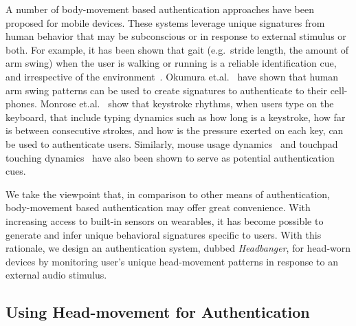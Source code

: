 

A number of body-movement based authentication approaches have been proposed for mobile devices. These systems
leverage unique signatures from human behavior that may be subconscious
or in response to external stimulus or both.  For example, it has been shown that gait (e.g.~stride length, the amount of arm swing) when the user is walking or
running is a reliable identification cue, and irrespective of the
environment~\cite{stevenage1999visual}. Okumura et.al.~\cite{okumura2006study}
have shown that human arm swing patterns can be used to create signatures
to authenticate to their cell-phones. Monrose
et.al.~\cite{monrose2000keystroke} show that keystroke rhythms, when
users type on the keyboard, that include typing dynamics such as how
long is a keystroke, how far is between consecutive strokes, and how is the
pressure exerted on each key, can be used to authenticate
users. Similarly, mouse usage dynamics~\cite{jorgensen2011mouse} and touchpad
touching dynamics~\cite{bo2013silentsense,de2012touch} have also been shown to
serve as potential authentication cues.

We take the viewpoint that, in comparison to other means of authentication, body-movement based
authentication may offer great convenience. With increasing access to built-in sensors on wearables, it
has become possible to generate and infer unique behavioral signatures
specific to users. With this rationale, we design an authentication system, dubbed {\em Headbanger}, for head-worn
devices by monitoring user's unique head-movement patterns in response to an
external audio stimulus.

\subsection{Using Head-movement for Authentication}
\label{subsec:headmovements}

